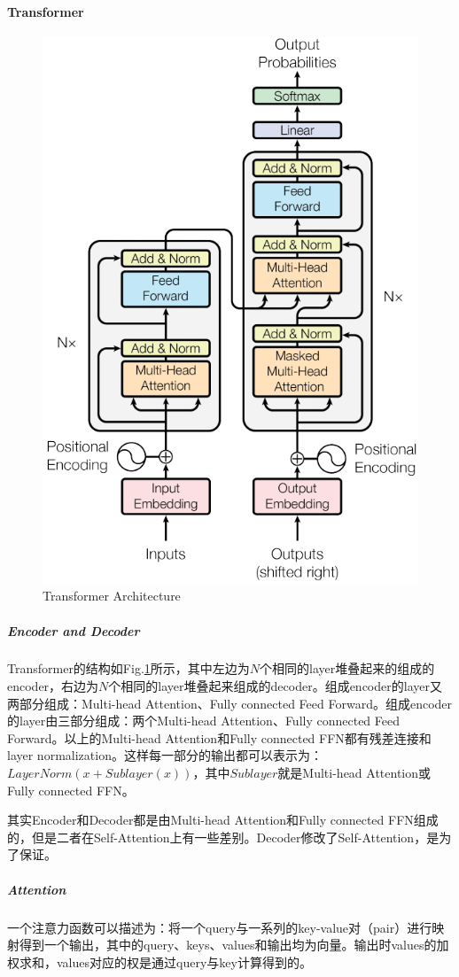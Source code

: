 \paragraph{Transformer}
\begin{figure}[h]
	\centering
	\includegraphics[width=.5\textwidth]{pics/Transformer.PNG}
	\caption{Transformer Architecture}
	\label{fig:transformer}
\end{figure}

\subparagraph{Encoder and Decoder}
Transformer的结构如Fig.\ref{fig:transformer}所示，其中左边为$N$个相同的layer堆叠起来的组成的encoder，右边为$N$个相同的layer堆叠起来组成的decoder。组成encoder的layer又两部分组成：Multi-head Attention、Fully connected Feed Forward。组成encoder的layer由三部分组成：两个Multi-head Attention、Fully connected Feed Forward。以上的Multi-head Attention和Fully connected FFN都有残差连接和layer normalization。这样每一部分的输出都可以表示为：$LayerNorm(x + Sublayer(x))$，其中$Sublayer$就是Multi-head Attention或Fully connected FFN。

其实Encoder和Decoder都是由Multi-head Attention和Fully connected FFN组成的，但是二者在Self-Attention上有一些差别。Decoder修改了Self-Attention，是为了保证。

\subparagraph{Attention}
一个注意力函数可以描述为：将一个query与一系列的key-value对（pair）进行映射得到一个输出，其中的query、keys、values和输出均为向量。输出时values的加权求和，values对应的权是通过query与key计算得到的。

